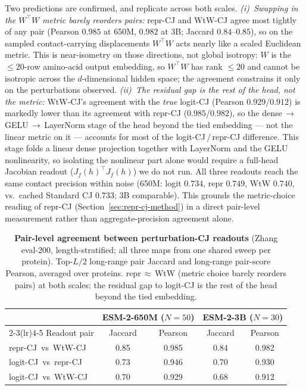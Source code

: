 \documentclass{article}
\begin{document}
Two predictions are confirmed, and replicate across both scales.
\emph{(i)~Swapping in the $W^\top W$ metric barely reorders pairs:}
repr-CJ and WtW-CJ agree most tightly of any pair (Pearson $0.985$ at
650M, $0.982$ at 3B; Jaccard $0.84$--$0.85$), so on the sampled
contact-carrying displacements $W^\top W$ acts nearly like a scaled
Euclidean metric. This is near-isometry on those directions, not global
isotropy: $W$ is the $\leq 20$-row amino-acid output embedding, so
$W^\top W$ has rank $\leq 20$ and cannot be isotropic across the
$d$-dimensional hidden space; the agreement constrains it only on the
perturbations observed. \emph{(ii)~The
residual gap is the rest of the head, not the metric:} WtW-CJ's agreement
with the \emph{true} logit-CJ (Pearson $0.929$/$0.912$) is markedly lower
than its agreement with repr-CJ ($0.985$/$0.982$), so the dense\,$\to$\,GELU\,$\to$\,LayerNorm
stage of the head beyond the tied embedding --- not the linear metric on
it --- accounts for most of the logit-CJ\,/\,repr-CJ difference. This
stage folds a linear dense projection together with LayerNorm and the
GELU nonlinearity, so isolating the nonlinear part alone would require a
full-head Jacobian readout ($J_f(h)^\top J_f(h)$) we do not run. All three readouts reach the same contact
precision within noise (650M: logit $0.734$, repr $0.749$, WtW $0.740$,
vs.\ cached Standard CJ $0.733$; 3B comparable). This grounds the
metric-choice reading of repr-CJ (Section~\ref{sec:repr-cj-method}) in a
direct pair-level measurement rather than aggregate-precision agreement
alone.

\begin{table}[h]
\centering
\small
\caption{\textbf{Pair-level agreement between perturbation-CJ readouts}
(Zhang eval-200, length-stratified; all three maps from one shared sweep
per protein). Top-$L/2$ long-range pair Jaccard and long-range pair-score
Pearson, averaged over proteins. repr\,$\approx$\,WtW (metric
choice barely reorders pairs) at both scales; the residual gap to
logit-CJ is the rest of the head beyond the tied embedding.}
\label{tab:wtw}
\begin{tabular}{lcccc}
\toprule
 & \multicolumn{2}{c}{ESM-2-650M ($N{=}50$)} & \multicolumn{2}{c}{ESM-2-3B ($N{=}30$)} \\
\cmidrule(lr){2-3}\cmidrule(lr){4-5}
Readout pair & Jaccard & Pearson & Jaccard & Pearson \\
\midrule
repr-CJ \,vs\, WtW-CJ   & 0.85 & 0.985 & 0.84 & 0.982 \\
logit-CJ \,vs\, repr-CJ & 0.73 & 0.946 & 0.70 & 0.930 \\
logit-CJ \,vs\, WtW-CJ  & 0.70 & 0.929 & 0.68 & 0.912 \\
\bottomrule
\end{tabular}
\end{table}
\end{document}
